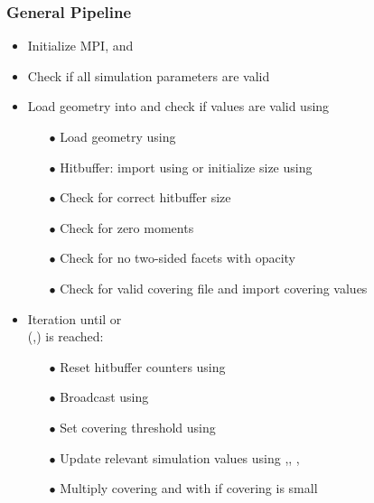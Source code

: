 \subsubsection{General Pipeline}
\begin{itemize}[noitemsep,topsep=0pt, partopsep=0pt]
\item Initialize MPI,  and 
\item Check if all simulation parameters are valid
\item Load geometry into  and check if values are valid using 
	\begin{itemize}[noitemsep,topsep=0pt, partopsep=0pt]
		\item[$\bullet$] Load geometry using 
		\item[$\bullet$] Hitbuffer: import using   or initialize size using  
		\item[$\bullet$] Check for correct hitbuffer size
		\item[$\bullet$] Check for zero moments
		\item[$\bullet$] Check for no two-sided facets with opacity
		\item[$\bullet$] Check for valid covering file and import covering values
	\end{itemize}
\item Iteration until  or\\  (,) is reached: \smallskip
	\begin{itemize}[noitemsep,topsep=0pt, partopsep=0pt]
	\item[$\bullet$] Reset hitbuffer counters using 
	\item[$\bullet$] Broadcast  using 
	\item[$\bullet$] Set covering threshold  using 
	\item[$\bullet$] Update relevant simulation values using ,\linebreak[4] , , 
	\item[$\bullet$] Multiply covering and  with  if covering is small

\end{itemize}
\end{itemize}
